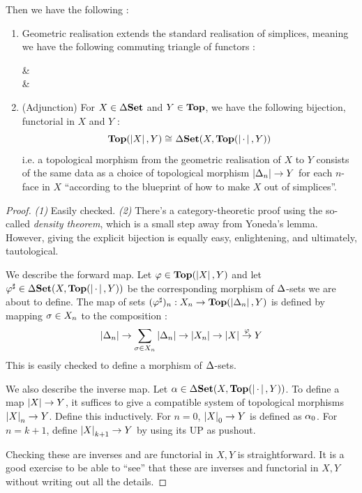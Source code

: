 \documentclass{article}
\begin{document}
\begin{prop}
  Then we have the following : 
  \begin{enumerate}
    \item Geometric realisation extends the standard realisation of 
    simplices, meaning we have the following commuting triangle of functors : 
    \begin{cd}
      \De \ar[d,"\De(-)"{swap}] 
        & \TOP \\
      \De\SET {}
        & 
    \end{cd}
    \item (Adjunction) For $X \in \Delta\mathbf{Set}$ and $Y \in \mathbf{Top}$,
    we have the following bijection, functorial in $X$ and $Y$ : 
    \[
      \mathbf{Top}(\left\vert X \right\vert,Y) \cong_{} \Delta\mathbf{Set}(X,\mathbf{Top}(\left\vert \,\cdot\, \right\vert,Y))
    \]
    i.e. a topological morphism from the geometric realisation 
    of $X$ to $Y$ consists of the same data as 
    a choice of topological morphism 
    $\left\vert \Delta_n \right\vert \to Y$ for each $n$-face in $X$ 
    ``according to the blueprint of how to make $X$ out of simplices''. 
  \end{enumerate}
\end{prop}
\begin{proof}
  \textit{(1)} Easily checked.
  \textit{(2)} There's a category-theoretic proof using 
  the so-called \emph{density theorem}, which is a small step away from 
  Yoneda's lemma. 
  However, giving the explicit bijection is equally easy, enlightening,
  and ultimately, tautological.
  
  We describe the forward map.
  Let $\varphi \in \mathbf{Top}(\left\vert X \right\vert,Y)$ and let 
  $\varphi^\sharp \in \Delta\mathbf{Set}(X,\mathbf{Top}(\left\vert \,\cdot\, \right\vert,Y))$ be the corresponding 
  morphism of $\Delta$-sets we are about to define.
  The map of sets $(\varphi^\sharp)_n : X_n \to \mathbf{Top}(\left\vert \Delta_n \right\vert,Y)$ is 
  defined by mapping $\sigma \in X_n$ to the composition : 
  \[
    \left\vert \Delta_n \right\vert \to \sum_{\sigma \in X_n} \left\vert \Delta_n \right\vert
    \to \left\vert X_n \right\vert \to \left\vert X \right\vert \overset{\varphi}{\to} Y
  \]
  This is easily checked to define a morphism of $\Delta$-sets.
  
  We also describe the inverse map. 
  Let $\alpha \in \Delta\mathbf{Set}(X,\mathbf{Top}(\left\vert \,\cdot\, \right\vert,Y))$.
  To define a map $\left\vert X \right\vert \to Y$,
  it suffices to give a compatible system of topological morphisms 
  $\left\vert X \right\vert_n \to Y$.
  Define this inductively. 
  For $n = 0$, $\left\vert X \right\vert_0 \to Y$ is defined as $\alpha_0$.
  For $n = k+1$, define $\left\vert X \right\vert_{k+1} \to Y$ by using its UP as pushout.

  Checking these are inverses and are functorial in $X, Y$ is straightforward.
  It is a good exercise to be able to ``see'' that these are inverses
  and functorial in $X,Y$ without writing out all the details.

\end{proof}
\end{document}
